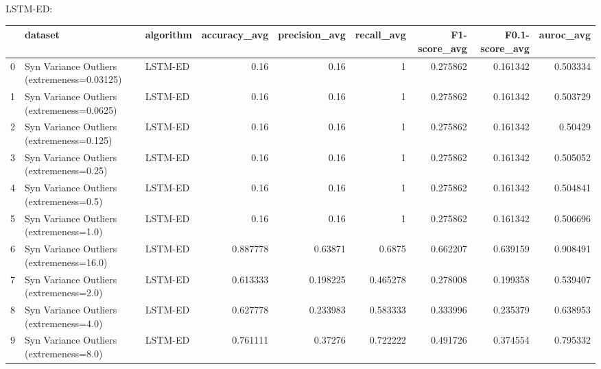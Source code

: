 LSTM-ED:

\begin{tabular}{rllrrrrrr}
\hline
    & dataset                                     & algorithm   &   accuracy\_avg &   precision\_avg &   recall\_avg &   F1-score\_avg &   F0.1-score\_avg &   auroc\_avg \\
\hline
  0 & Syn Variance Outliers (extremeness=0.03125) & LSTM-ED     &       0.16     &        0.16     &     1        &       0.275862 &         0.161342 &    0.503334 \\
  1 & Syn Variance Outliers (extremeness=0.0625)  & LSTM-ED     &       0.16     &        0.16     &     1        &       0.275862 &         0.161342 &    0.503729 \\
  2 & Syn Variance Outliers (extremeness=0.125)   & LSTM-ED     &       0.16     &        0.16     &     1        &       0.275862 &         0.161342 &    0.50429  \\
  3 & Syn Variance Outliers (extremeness=0.25)    & LSTM-ED     &       0.16     &        0.16     &     1        &       0.275862 &         0.161342 &    0.505052 \\
  4 & Syn Variance Outliers (extremeness=0.5)     & LSTM-ED     &       0.16     &        0.16     &     1        &       0.275862 &         0.161342 &    0.504841 \\
  5 & Syn Variance Outliers (extremeness=1.0)     & LSTM-ED     &       0.16     &        0.16     &     1        &       0.275862 &         0.161342 &    0.506696 \\
  6 & Syn Variance Outliers (extremeness=16.0)    & LSTM-ED     &       0.887778 &        0.63871  &     0.6875   &       0.662207 &         0.639159 &    0.908491 \\
  7 & Syn Variance Outliers (extremeness=2.0)     & LSTM-ED     &       0.613333 &        0.198225 &     0.465278 &       0.278008 &         0.199358 &    0.539407 \\
  8 & Syn Variance Outliers (extremeness=4.0)     & LSTM-ED     &       0.627778 &        0.233983 &     0.583333 &       0.333996 &         0.235379 &    0.638953 \\
  9 & Syn Variance Outliers (extremeness=8.0)     & LSTM-ED     &       0.761111 &        0.37276  &     0.722222 &       0.491726 &         0.374554 &    0.795332 \\
\hline
\end{tabular}

